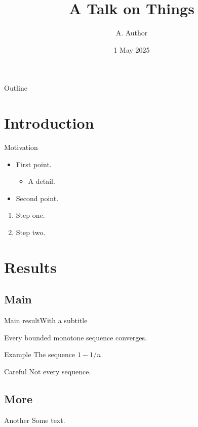 \documentclass{beamer}
\title[Short]{A Talk on Things}
\author{A. Author}
\institute{Institute}
\date{1 May 2025}
\begin{document}
\begin{frame}
\titlepage
\end{frame}
\begin{frame}{Outline}
\tableofcontents
\end{frame}
\section{Introduction}
\begin{frame}{Motivation}
\begin{itemize}
\item First point.
\begin{itemize}
\item A detail.
\end{itemize}
\item Second point.
\end{itemize}
\begin{enumerate}
\item Step one.
\item Step two.
\end{enumerate}
\end{frame}
\section{Results}
\subsection{Main}
\begin{frame}{Main result}{With a subtitle}
\begin{theorem}
Every bounded monotone sequence converges.
\end{theorem}
\begin{exampleblock}{Example}
The sequence $1 - 1/n$.
\end{exampleblock}
\begin{alertblock}{Careful}
Not every sequence.
\end{alertblock}
\end{frame}
\subsection{More}
\begin{frame}{Another}
Some text.
\end{frame}
\end{document}
